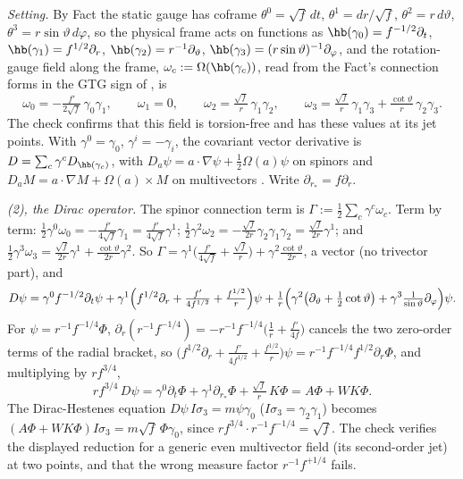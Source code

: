 \emph{Setting.} By Fact  the static gauge has coframe $\theta^{0} = \sqrt f\,dt$, $\theta^{1} = dr/\sqrt f$, $\theta^{2} = r\,d\vartheta$, $\theta^{3} = r\sin\vartheta\,d\varphi$, so the physical frame acts on functions as $\hb(\gamma_{0}) = f^{-1/2}\partial_{t}$, $\hb(\gamma_{1}) = f^{1/2}\partial_{r}$, $\hb(\gamma_{2}) = r^{-1}\partial_{\vartheta}$, $\hb(\gamma_{3}) = (r\sin\vartheta)^{-1}\partial_{\varphi}$, and the rotation-gauge field along the frame, $\omega_{c} := \Omega(\hb(\gamma_{c}))$, read from the Fact's connection forms in the GTG sign of , is
\[
\omega_{0} = -\tfrac{f'}{2\sqrt f}\,\gamma_{0}\gamma_{1}, \qquad \omega_{1} = 0, \qquad \omega_{2} = \tfrac{\sqrt f}{r}\,\gamma_{1}\gamma_{2}, \qquad \omega_{3} = \tfrac{\sqrt f}{r}\,\gamma_{1}\gamma_{3} + \tfrac{\cot\vartheta}{r}\,\gamma_{2}\gamma_{3}.
\]
The check confirms that this field is torsion-free and has these values at its jet points. With $\gamma^{0} = \gamma_{0}$, $\gamma^{i} = -\gamma_{i}$, the covariant vector derivative is $D = \sum_{c}\gamma^{c} D_{\hb(\gamma_{c})}$, with $D_{a}\psi = a \cdot \nabla\psi + \tfrac12\Omega(a)\psi$ on spinors and $D_{a}M = a \cdot \nabla M + \Omega(a) \times M$ on multivectors . Write $\partial_{r_{*}} = f\partial_{r}$.

\emph{(2), the Dirac operator.} The spinor connection term is $\Gamma := \tfrac12\sum_{c}\gamma^{c}\omega_{c}$. Term by term: $\tfrac12\gamma^{0}\omega_{0} = -\tfrac{f'}{4\sqrt f}\gamma_{1} = \tfrac{f'}{4\sqrt f}\gamma^{1}$; $\tfrac12\gamma^{2}\omega_{2} = -\tfrac{\sqrt f}{2r}\gamma_{2}\gamma_{1}\gamma_{2} = \tfrac{\sqrt f}{2r}\gamma^{1}$; and $\tfrac12\gamma^{3}\omega_{3} = \tfrac{\sqrt f}{2r}\gamma^{1} + \tfrac{\cot\vartheta}{2r}\gamma^{2}$. So $\Gamma = \gamma^{1}\bigl(\tfrac{f'}{4\sqrt f} + \tfrac{\sqrt f}{r}\bigr) + \gamma^{2}\tfrac{\cot\vartheta}{2r}$, a vector (no trivector part), and
\[
D\psi = \gamma^{0}f^{-1/2}\partial_{t}\psi + \gamma^{1}\Bigl(f^{1/2}\partial_{r} + \tfrac{f'}{4 f^{1/2}} + \tfrac{f^{1/2}}{r}\Bigr)\psi + \tfrac1r\Bigl(\gamma^{2}\bigl(\partial_{\vartheta} + \tfrac12\cot\vartheta\bigr) + \gamma^{3}\tfrac{1}{\sin\vartheta}\partial_{\varphi}\Bigr)\psi .
\]
For $\psi = r^{-1}f^{-1/4}\Phi$, $\partial_{r}(r^{-1}f^{-1/4}) = -r^{-1}f^{-1/4}\bigl(\tfrac1r + \tfrac{f'}{4f}\bigr)$ cancels the two zero-order terms of the radial bracket, so $\bigl(f^{1/2}\partial_{r} + \tfrac{f'}{4f^{1/2}} + \tfrac{f^{1/2}}{r}\bigr)\psi = r^{-1}f^{-1/4}f^{1/2}\partial_{r}\Phi$, and multiplying by $r f^{3/4}$,
\[
r f^{3/4}\,D\psi = \gamma^{0}\partial_{t}\Phi + \gamma^{1}\partial_{r_{*}}\Phi + \tfrac{\sqrt f}{r}\,K\Phi = A\Phi + WK\Phi .
\]
The Dirac-Hestenes equation $D\psi\,I\sigma_{3} = m\psi\gamma_{0}$ ($I\sigma_{3} = \gamma_{2}\gamma_{1}$) becomes $(A\Phi + WK\Phi)I\sigma_{3} = m\sqrt f\,\Phi\gamma_{0}$, since $r f^{3/4}\cdot r^{-1}f^{-1/4} = \sqrt f$. The check verifies the displayed reduction for a generic even multivector field (its second-order jet) at two points, and that the wrong measure factor $r^{-1}f^{+1/4}$ fails.


